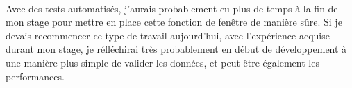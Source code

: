 \documentclass{article}
\begin{document}
    \paragraph{}
    Avec des tests automatisés, j'aurais probablement eu plus de temps à la fin de mon stage pour mettre en place cette fonction de fenêtre de manière sûre. Si je devais recommencer ce type de travail aujourd'hui, avec l'expérience acquise durant mon stage, je réfléchirai très probablement en début de développement à une manière plus simple de valider les données, et peut-être également les performances.

    


\end{document}
